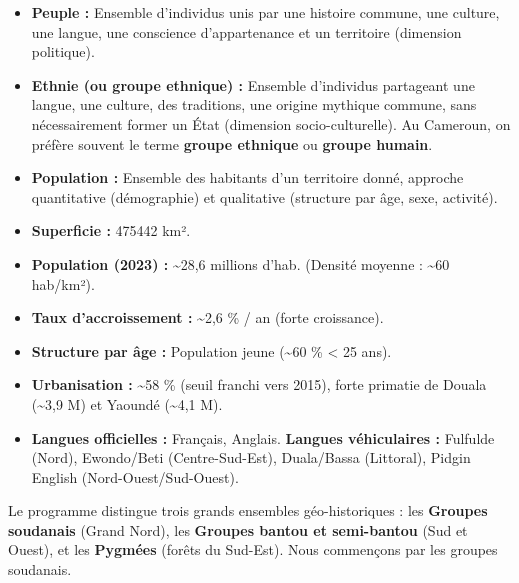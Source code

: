 \documentclass[11pt]{article}
\begin{document}
\begin{definition}
\begin{itemize}
    \item \textbf{Peuple :} Ensemble d'individus unis par une histoire commune, une culture, une langue, une conscience d'appartenance et un territoire (dimension politique).
    \item \textbf{Ethnie (ou groupe ethnique) :} Ensemble d'individus partageant une langue, une culture, des traditions, une origine mythique commune, sans nécessairement former un État (dimension socio-culturelle). Au Cameroun, on préfère souvent le terme \textbf{groupe ethnique} ou \textbf{groupe humain}.
    \item \textbf{Population :} Ensemble des habitants d'un territoire donné, approche quantitative (démographie) et qualitative (structure par âge, sexe, activité).
\end{itemize}
\end{definition}

\begin{aretenir}
\begin{itemize}
    \item \textbf{Superficie :} \num{475 442} km².
    \item \textbf{Population (2023) :} \textasciitilde 28,6 millions d'hab. (Densité moyenne : \textasciitilde 60 hab/km²).
    \item \textbf{Taux d'accroissement :} \textasciitilde 2,6 \% / an (forte croissance).
    \item \textbf{Structure par âge :} Population jeune (\textasciitilde 60 \% < 25 ans).
    \item \textbf{Urbanisation :} \textasciitilde 58 \% (seuil franchi vers 2015), forte primatie de Douala (\textasciitilde 3,9 M) et Yaoundé (\textasciitilde 4,1 M).
    \item \textbf{Langues officielles :} Français, Anglais. \textbf{Langues véhiculaires :} Fulfulde (Nord), Ewondo/Beti (Centre-Sud-Est), Duala/Bassa (Littoral), Pidgin English (Nord-Ouest/Sud-Ouest).
\end{itemize}
\end{aretenir}

\noindent Le programme distingue trois grands ensembles géo-historiques : les \textbf{Groupes soudanais} (Grand Nord), les \textbf{Groupes bantou et semi-bantou} (Sud et Ouest), et les \textbf{Pygmées} (forêts du Sud-Est). Nous commençons par les groupes soudanais.
\end{document}
